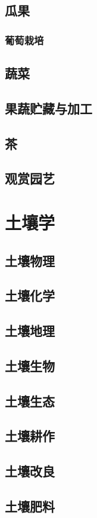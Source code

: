 \documentclass[UTF8]{../ApplicationUniverse}
\begin{document}
\section{瓜果}
   \subsection{葡萄栽培}
\section{蔬菜}
\section{果蔬贮藏与加工}
\section{茶}
\section{观赏园艺}

\chapter{土壤学}
\section{土壤物理}
\section{土壤化学}
\section{土壤地理}
\section{土壤生物}
\section{土壤生态}
\section{土壤耕作}
\section{土壤改良}
\section{土壤肥料}
\end{document}
